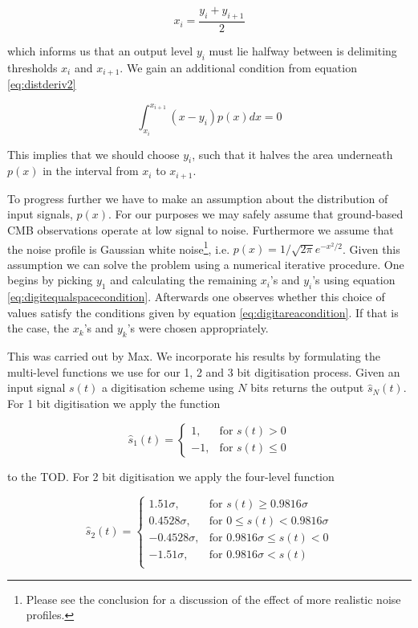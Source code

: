 \documentclass[apj]{emulateapj}
\begin{document}
\begin{equation} \label{eq:digitequalspacecondition}
x_i = \frac{y_i+y_{i+1}}{2}
\end{equation}

which informs us that an output level $y_i$ must lie halfway between is delimiting thresholds $x_i$ and $x_{i+1}$. We gain an additional condition from equation \ref{eq:distderiv2}

\begin{equation} \label{eq:digitareacondition}
\int_{x_i}^{x_{i+1}} \left( x-y_i \right) p(x) dx = 0
\end{equation}

This implies that we should choose $y_i$, such that it halves the area underneath $p(x)$ in the interval from $x_i$ to $x_{i+1}$.

To progress further we have to make an assumption about the distribution of input signals, $p(x)$. For our purposes we may safely assume that ground-based CMB observations operate at low signal to noise. Furthermore we assume that the noise profile is Gaussian white noise\footnote{Please see the conclusion for a discussion of the effect of more realistic noise profiles.}, i.e. $p(x) = 1/\sqrt{2\pi} e^{-x^2/2}$. Given this assumption we can solve the problem using a numerical iterative procedure. One begins by picking $y_1$ and calculating the remaining $x_i$'s and $y_i$'s using equation \ref{eq:digitequalspacecondition}. Afterwards one observes whether this choice of values satisfy the conditions given by equation \ref{eq:digitareacondition}. If that is the case, the $x_k$'s and $y_k$'s were chosen appropriately.

This was carried out by Max. We incorporate his results by formulating the multi-level functions we use for our 1, 2 and 3 bit digitisation process. Given an input signal $s(t)$ a digitisation scheme using $N$ bits returns the output $\hat{s}_N(t)$. For 1 bit digitisation we apply the function

\[ \hat{s}_1(t) = \left\{ \begin{array}{lr}
1, & \text{for } s(t) > 0\\
-1, & \text{for } s(t) \leq 0
\end{array} \right. \]

to the TOD. For 2 bit digitisation we apply the four-level function

\[ \hat{s}_2(t) = \left\{ \begin{array}{rl}
1.51 \sigma, & \text{for } s(t) \geq 0.9816 \sigma\\
0.4528 \sigma, & \text{for } 0 \leq s(t) < 0.9816 \sigma\\
-0.4528 \sigma, & \text{for } 0.9816 \sigma \leq s(t) < 0\\
-1.51 \sigma, & \text{for } 0.9816 \sigma < s(t)\\
\end{array} \right. \]
\end{document}
